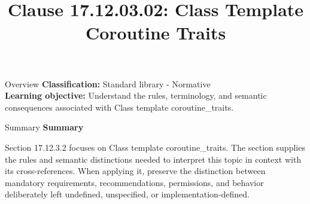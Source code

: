 \documentclass[10pt,letterpaper]{article}
\title{Clause 17.12.03.02: Class Template Coroutine Traits}
\author{}
\date{}
\begin{document}
\maketitle
\begin{CornellOverviewBox}{Overview}
\textbf{Classification:} Standard library - Normative\\[2pt]
\textbf{Learning objective:} Understand the rules, terminology, and semantic consequences associated with Class template coroutine\_traits.
\end{CornellOverviewBox}\begin{CornellSummaryBox}{Summary}
{\sffamily\bfseries\color{Accent} Summary}\par\vspace{3pt}Section 17.12.3.2 focuses on Class template coroutine\_traits. The section supplies the rules and semantic distinctions needed to interpret this topic in context with its cross-references. When applying it, preserve the distinction between mandatory requirements, recommendations, permissions, and behavior deliberately left undefined, unspecified, or implementation-defined.
\end{CornellSummaryBox}
\end{document}
